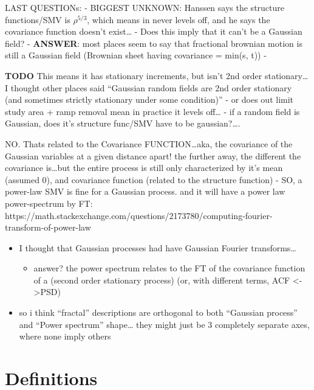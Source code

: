 \documentclass{utexasthesis}
\begin{document}
LAST QUESTIONs: - BIGGEST UNKNOWN: Hanssen says the structure
functions/SMV is \(\rho^{5/3}\), which means in never levels off, and he says the covariance function doesn't exist\ldots{} - Does this imply that it can't be a Gaussian field? - \textbf{ANSWER}: most places seem to say that fractional brownian motion is still a Gaussian field (Brownian sheet having covariance = min(s, t)) - 

\textbf{TODO} This means it has stationary increments, but isn't 2nd order stationary\ldots I thought other places said ``Gaussian random fields are 2nd order stationary (and sometimes strictly stationary under some condition)'' - or does out limit study area + ramp removal mean in practice it levels off\ldots{} - if a random field is Gaussian, does it's structure func/SMV have to be gaussian?\ldots{}. 

NO. Thats related to the Covariance FUNCTION\ldots aka, the covariance of the Gaussian variables at a given distance apart! the further away, the different the
covariance is\ldots but the entire process is still only characterized by it's mean (assumed 0), and covariance function (related to the structure function) - SO, a power-law SMV is fine for a Gaussian process. and it will have a power law power-spectrum by FT:
https://math.stackexchange.com/questions/2173780/computing-fourier-transform-of-power-law

\begin{itemize}

\item
  I thought that Gaussian processes had have Gaussian Fourier
  transforms\ldots{}

  \begin{itemize}
  
  \item
    answer? the power spectrum relates to the FT of the covariance
    function of a (second order stationary process) (or, with different
    terms, ACF <->PSD)
  \end{itemize}
\item
  so i think ``fractal'' descriptions are orthogonal to both ``Gaussian
  process'' and ``Power spectrum'' shape\ldots{} they might just be 3
  completely separate axes, where none imply others
\end{itemize}

\hypertarget{definitions}{%
\section{Definitions}\label{definitions}}
\end{document}
